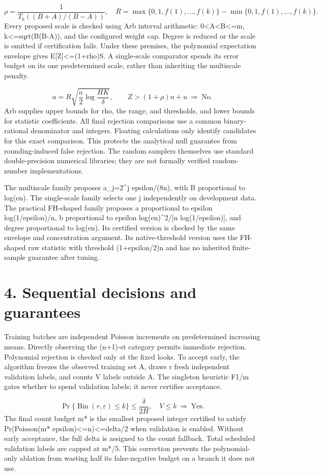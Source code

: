 \documentclass[10pt]{article}
\begin{document}
\[
\rho=\frac1{T_k((B+A)/(B-A))},\quad R=\max\{0,1,f(1),\ldots,f(k)\}-\min\{0,1,f(1),\ldots,f(k)\}.
\]
Every proposed scale is checked using Arb interval arithmetic: 0<A<B<=m, k<=sqrt(B(B-A)), and the configured weight cap. Degree is reduced or the scale is omitted if certification fails. Under these premises, the polynomial expectation envelope gives E[Z]<=(1+rho)S. A single-scale comparator spends its error budget on its one predetermined scale, rather than inheriting the multiscale penalty.

\[
u=R\sqrt{\frac n2\log\frac{HK}{\delta}},\qquad Z>(1+\rho)n+u\ \Longrightarrow\ \mathrm{No}.
\]
Arb supplies upper bounds for rho, the range, and thresholds, and lower bounds for statistic coefficients. All final rejection comparisons use a common binary-rational denominator and integers. Floating calculations only identify candidates for this exact comparison. This protects the analytical null guarantee from rounding-induced false rejection. The random samplers themselves use standard double-precision numerical libraries; they are not formally verified random-number implementations.

The multiscale family proposes a\_j=2^j epsilon/(8n), with B proportional to log(en). The single-scale family selects one j independently on development data. The practical FH-shaped family proposes a proportional to epsilon log(1/epsilon)/n, b proportional to epsilon log(en)^2/[n log(1/epsilon)], and degree proportional to log(en). Its certified version is checked by the same envelope and concentration argument. Its native-threshold version uses the FH-shaped raw statistic with threshold (1+epsilon/2)n and has no inherited finite-sample guarantee after tuning.

\section*{4. Sequential decisions and guarantees}
Training batches are independent Poisson increments on predetermined increasing means. Directly observing the (n+1)-st category permits immediate rejection. Polynomial rejection is checked only at the fixed looks. To accept early, the algorithm freezes the observed training set A, draws r fresh independent validation labels, and counts V labels outside A. The singleton heuristic F1/m gates whether to spend validation labels; it never certifies acceptance.

\[
\Pr\{\operatorname{Bin}(r,\varepsilon)\le k\}\le\frac\delta{2H},\quad V\le k\ \Longrightarrow\ \mathrm{Yes}.
\]
The final count budget m* is the smallest proposed integer certified to satisfy Pr(Poisson(m* epsilon)<=n)<=delta/2 when validation is enabled. Without early acceptance, the full delta is assigned to the count fallback. Total scheduled validation labels are capped at m*/5. This correction prevents the polynomial-only ablation from wasting half its false-negative budget on a branch it does not use.
\end{document}
